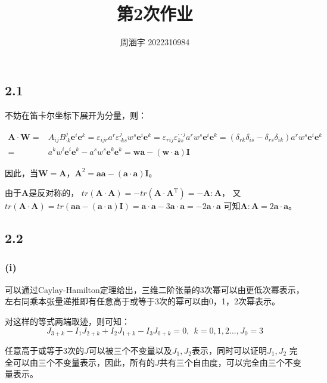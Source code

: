 \documentclass[UTF8,zihao=5]{ctexart}
\title{{\bfseries 第2次作业}}
\author{周涵宇 2022310984}
\date{}
\newcommand{\bm}[1]{{\mathbf{#1}}}
\newcommand{\trans}[0]{^\mathrm{T}}
\begin{document}
\maketitle

\subsection*{2.1}

不妨在笛卡尔坐标下展开为分量，则：

\begin{equation}
    \begin{aligned}
        \bm{A}\cdot\bm{W}=&A_{ij}B^j_{\cdot k}\bm{e}^i\bm{e}^k
        =\varepsilon_{ijr}a^r\varepsilon^j_{\cdot ks}w^s\bm{e}^i\bm{e}^k
        =\varepsilon_{rij}\varepsilon^{\cdot\cdot j}_{ks}a^rw^s\bm{e}^i\bm{e}^k
        =(\delta_{rk}\delta_{is} - \delta_{rs}\delta_{ik})a^rw^s\bm{e}^i\bm{e}^k\\
        =&a^kw^i\bm{e}^i\bm{e}^k-a^sw^s\bm{e}^k\bm{e}^k
        =\bm{w}\bm{a}-(\bm{w}\cdot\bm{a})\bm{I}
    \end{aligned}
\end{equation}

因此，当$\bm{W}=\bm{A}$，$\bm{A}^2=\bm{a}\bm{a}-(\bm{a}\cdot\bm{a})\bm{I}$。

由于$\bm{A}$是反对称的，
$tr(\bm{A}\cdot\bm{A}) = -tr(\bm{A}\cdot\bm{A}\trans)=-\bm{A}:\bm{A} $，
又$tr(\bm{A}\cdot\bm{A})=tr(\bm{a}\bm{a}-(\bm{a}\cdot\bm{a})\bm{I})=\bm{a}\cdot\bm{a}-3\bm{a}\cdot\bm{a}=-2\bm{a}\cdot\bm{a}$
可知$\bm{A}:\bm{A}=2\bm{a}\cdot\bm{a}$。

\subsection*{2.2}
\subsubsection*{(i)}
可以通过Caylay-Hamilton定理给出，三维二阶张量的3次幂可以由更低次幂表示，
左右同乘本张量递推即有任意高于或等于3次的幂可以由0，1，2次幂表示。



对这样的等式两端取迹，则可知：
\begin{equation}
    J_{3+k}-I_1J_{2+k}+I_2J_{1+k}-I_3J_{0+k}=0,\ \  k=0,1,2..., J_0=3
\end{equation}

任意高于或等于3次的$J$可以被三个不变量以及$J_1,J_2$表示，同时可以证明$J_1,J_2$
完全可以由三个不变量表示，因此，所有的$J$共有三个自由度，可以完全由三个不变量表示。
\end{document}
